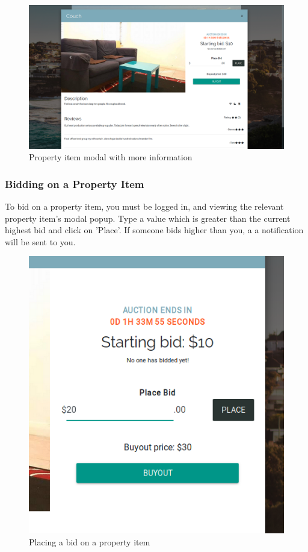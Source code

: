 \begin{figure}[!h]
  \includegraphics[width=\linewidth]{assets/userManual/propertyModal.png}
  \caption{Property item modal with more information}
  \label{fig:propertyModal}
\end{figure}

\subsubsection{Bidding on a Property Item}
To bid on a property item, you must be logged in, and viewing the relevant
property item's modal popup. Type a value which is greater than the current
highest bid and click on 'Place'. If someone bids higher than you, a
a notification will be sent to you.

\begin{figure}[!h]
  \includegraphics[width=\linewidth]{assets/userManual/biddingModule.png}
  \caption{Placing a bid on a property item}
  \label{fig:biddingModule}
\end{figure}

